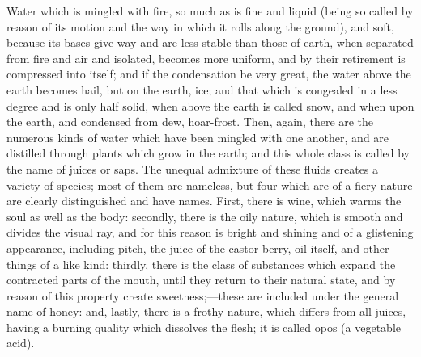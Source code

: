 \documentclass[11pt,letter]{article}
\begin{document}
\par  Water which is mingled with fire, so much as is fine and liquid (being so called by reason of its motion and the way in which it rolls along the ground), and soft, because its bases give way and are less stable than those of earth, when separated from fire and air and isolated, becomes more uniform, and by their retirement is compressed into itself; and if the condensation be very great, the water above the earth becomes hail, but on the earth, ice; and that which is congealed in a less degree and is only half solid, when above the earth is called snow, and when upon the earth, and condensed from dew, hoar-frost. Then, again, there are the numerous kinds of water which have been mingled with one another, and are distilled through plants which grow in the earth; and this whole class is called by the name of juices or saps. The unequal admixture of these fluids creates a variety of species; most of them are nameless, but four which are of a fiery nature are clearly distinguished and have names. First, there is wine, which warms the soul as well as the body: secondly, there is the oily nature, which is smooth and divides the visual ray, and for this reason is bright and shining and of a glistening appearance, including pitch, the juice of the castor berry, oil itself, and other things of a like kind: thirdly, there is the class of substances which expand the contracted parts of the mouth, until they return to their natural state, and by reason of this property create sweetness;—these are included under the general name of honey: and, lastly, there is a frothy nature, which differs from all juices, having a burning quality which dissolves the flesh; it is called opos (a vegetable acid).
\end{document}
